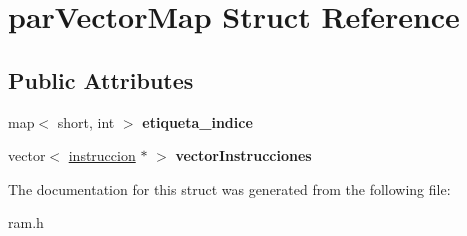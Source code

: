 \hypertarget{structparVectorMap}{}\section{par\+Vector\+Map Struct Reference}
\label{structparVectorMap}
\subsection*{Public Attributes}
\begin{DoxyCompactItemize}
\item 
\hypertarget{structparVectorMap_a0fdd1b24e5c68889d1eb712ec9932296}{}map$<$ short, int $>$ {\bfseries etiqueta\+\_\+indice}\label{structparVectorMap_a0fdd1b24e5c68889d1eb712ec9932296}

\item 
\hypertarget{structparVectorMap_a06a4c28d1d626b3a2a07aa675442c728}{}vector$<$ \hyperlink{classinstruccion}{instruccion} $\ast$ $>$ {\bfseries vector\+Instrucciones}\label{structparVectorMap_a06a4c28d1d626b3a2a07aa675442c728}

\end{DoxyCompactItemize}


The documentation for this struct was generated from the following file\+:\begin{DoxyCompactItemize}
\item 
ram.\+h\end{DoxyCompactItemize}
